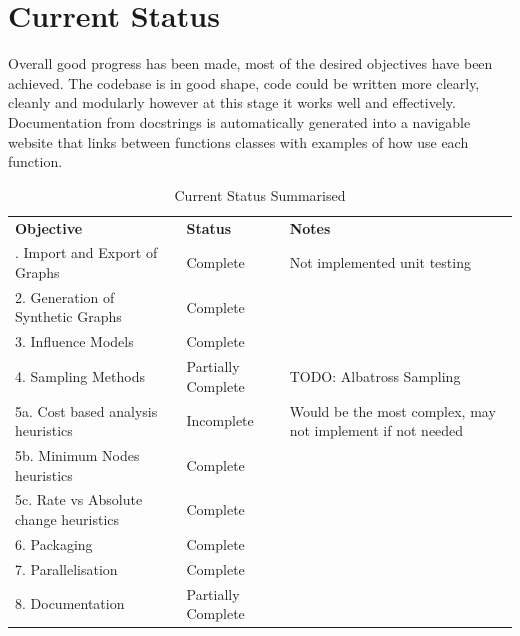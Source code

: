 \documentclass{article}
\begin{document}
\section{Current Status}

Overall good progress has been made, most of the desired objectives have been achieved.
The codebase is in good shape, code could be written more clearly, cleanly and modularly however at this stage it works well and effectively.
Documentation from docstrings is automatically generated into a navigable website that links between functions classes with examples of how use each function.

\begin{table}[h]
	\centering
	\begin{tabular}{|p{5.8cm}|p{2.9cm}|p{5cm}|}
		\hline
		\textbf{Objective}                     & \textbf{Status}    & \textbf{Notes}                                             \\
		\rowcolor{green}
		\hline
		1. Import and Export of Graphs         & Complete           & Not implemented unit testing                               \\
		\hline
		\rowcolor{green}
		2. Generation of Synthetic Graphs      & Complete           &                                                            \\
		\hline
		\rowcolor{green}
		3. Influence Models                    & Complete           &                                                            \\
		\hline
		\rowcolor{yellow}
		4. Sampling Methods                    & Partially Complete & TODO: Albatross Sampling                                   \\
		\hline
		\rowcolor{red}
		5a. Cost based analysis heuristics     & Incomplete         & Would be the most complex, may not implement if not needed \\
		\hline
		\rowcolor{green}
		5b. Minimum Nodes heuristics           & Complete           &                                                            \\
		\hline
		\rowcolor{green}
		5c. Rate vs Absolute change heuristics & Complete           &                                                            \\
		\hline
		\rowcolor{green}
		6. Packaging                           & Complete           &                                                            \\
		\hline
		\rowcolor{green}
		7. Parallelisation                     & Complete           &                                                            \\
		\hline
		\rowcolor{yellow}
		8. Documentation                       & Partially Complete &                                                            \\
		\hline
	\end{tabular}
	\caption{Current Status Summarised}
	\label{statusOverview}
\end{table}
\end{document}
